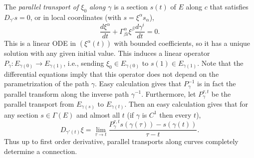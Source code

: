 The \emph{parallel transport of $\xi_0$ along $\gamma$} is a section $s(t)$ of $E$ along $c$ that satisfies $D_{\gamma'}s=0$, or in local coordinates (with $s=\xi^\alpha s_\alpha$),
$$\frac{d\xi^\alpha}{dt}+\Gamma_{\beta i}^\alpha\xi^\beta\frac{d\gamma^i}{dt}=0.$$
This is a linear ODE in $(\xi^\alpha(t))$ with bounded coefficients, so it has a unique solution with any given initial value. This induces a linear operator $P_{\gamma}:E_{\gamma(0)}\to E_{\gamma(1)}$, i.e., sending $\xi_0\in E_{\gamma(0)}$ to $s(1)\in E_{\gamma(1)}$. Note that the differential equations imply that this operator does not depend on the parametrization of the path $\gamma$. Easy calculation gives that $P_\gamma^{-1}$ is in fact the parallel transform along the inverse path $\gamma^{-1}$. Furthermore, let $P_\gamma^{\tau,t}$ be the parallel transport from $E_{\gamma(s)}$ to $E_{\gamma(t)}$. Then an easy calculation gives that for any section $s\in\Gamma(E)$ and almost all $t$ (if $\gamma$ is $C^1$ then every $t$),
$$D_{\gamma'(t)}\xi=\lim_{\tau\to t}\frac{P_\gamma^{\tau,t}s(\gamma(\tau))-s(\gamma(t))}{\tau-t}.$$
Thus up to first order derivative, parallel transports along curves completely determine a connection.